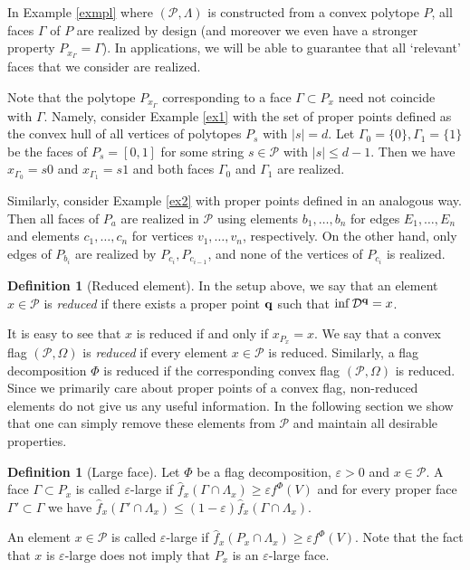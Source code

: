 \documentclass{daj}
\renewcommand{\le}{\leqslant}
\renewcommand{\ge}{\geqslant}
\newcommand{\D}{\mathcal D}
\renewcommand{\P}{\mathcal P}
\theoremstyle{definition}
\newtheorem{defi}[theorem]{Definition}
\theoremstyle{remark}
\theoremstyle{definition}
\theoremstyle{definition}
\begin{document}
In Example \ref{exmpl} where $(\P,\Lambda)$ is constructed from a convex polytope $P$, all faces $\Gamma$ of $P$ are realized by design (and moreover we even have a stronger property $P_{x_\Gamma} = \Gamma$). In applications, we will be able to guarantee that all `relevant' faces that we consider are realized. 

Note that the polytope $P_{x_\Gamma}$ corresponding to a face $\Gamma\subset P_x$ need not coincide with $\Gamma$. Namely, consider Example \ref{ex1} with the set of proper points defined as the convex hull of all vertices of polytopes $P_s$ with $|s| = d$. 
Let $\Gamma_0 = \{0\}, \Gamma_1 = \{1\}$ be the faces of $P_{s} = [0,1]$ for some string $s \in \P$ with $|s|\le d-1$. Then we have $x_{\Gamma_0} = s0$ and $x_{\Gamma_1} = s1$ and both faces $\Gamma_0$ and $\Gamma_1$ are realized. 

Similarly, consider Example \ref{ex2} with proper points defined in an analogous way. Then all faces of $P_a$ are realized in $\P$ using elements $b_1, \ldots,b_n$ for edges $E_1, \ldots, E_n$ and elements $c_1, \ldots,c_n$ for vertices $v_1, \ldots, v_n$, respectively. On the other hand, only edges of $P_{b_i}$ are realized by $P_{c_i}, P_{c_{i-1}}$, and none of the vertices of $P_{c_i}$ is realized. 



\begin{defi}[Reduced element]
    In the setup above,  we say that an element $x \in \P$ is {\em reduced} if there exists a proper point ${\bf q}$ such that $\inf \D^{\bf q} = x$.
\end{defi}

It is easy to see that $x$ is reduced if and only if $x_{P_x} = x$.
We say that a convex flag $(\P, \Omega)$ is {\em reduced} if every element $x\in \P$ is reduced. Similarly, a flag decomposition $\Phi$ is reduced if the corresponding convex flag $(\P,\Omega)$ is reduced.
Since we primarily care about proper points of a convex flag, non-reduced elements do not give us any useful information. In the following section we show that one can simply remove these elements from $\P$ and maintain all desirable properties. 

\begin{defi}[Large face]\label{largef}
Let $\Phi$ be a flag decomposition, $\varepsilon>0$ and $x \in \P$. A face $\Gamma \subset P_x$ is called $\varepsilon$-large if $\hat f_x(\Gamma \cap \Lambda_x) \ge \varepsilon f^\Phi(V)$ and for every proper face $\Gamma' \subset \Gamma$ we have $\hat f_x(\Gamma' \cap \Lambda_x) \le (1-\varepsilon) \hat f_x(\Gamma \cap \Lambda_x)$. 

An element $x \in \P$ is called $\varepsilon$-large if $\hat f_x(P_x \cap \Lambda_x) \ge \varepsilon f^\Phi(V)$. Note that the fact that $x$ is $\varepsilon$-large does not imply that $P_x$ is an $\varepsilon$-large face.
\end{defi}
\end{document}
